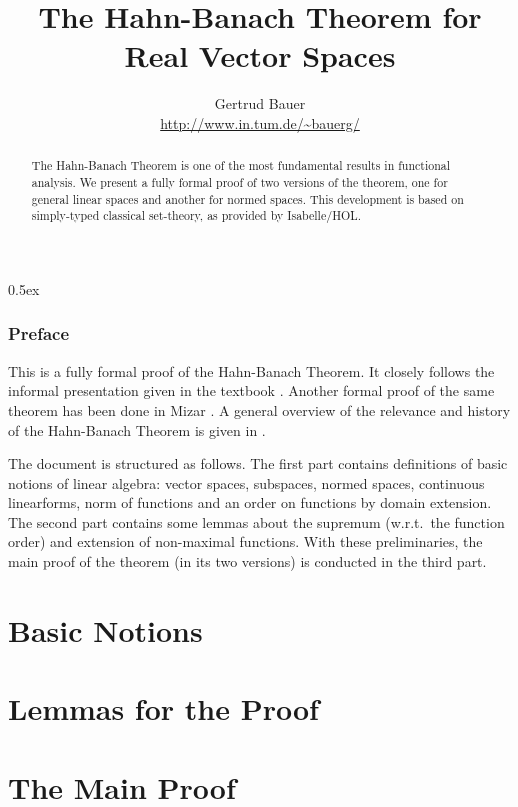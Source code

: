 \documentclass[10pt,a4paper,twoside]{article}
\begin{document}
\pagestyle{headings}

\title{The Hahn-Banach Theorem for Real Vector Spaces}
\author{Gertrud Bauer \\ \url{http://www.in.tum.de/~bauerg/}}
\maketitle

\begin{abstract}
  The Hahn-Banach Theorem is one of the most fundamental results in functional
  analysis. We present a fully formal proof of two versions of the theorem,
  one for general linear spaces and another for normed spaces.  This
  development is based on simply-typed classical set-theory, as provided by
  Isabelle/HOL.
\end{abstract}


\tableofcontents
\parindent 0pt \parskip 0.5ex

\clearpage
\section{Preface}

This is a fully formal proof of the Hahn-Banach Theorem. It closely follows
the informal presentation given in the textbook \cite[{\S} 36]{Heuser:1986}.
Another formal proof of the same theorem has been done in Mizar
\cite{Nowak:1993}.  A general overview of the relevance and history of the
Hahn-Banach Theorem is given in \cite{Narici:1996}.

\medskip The document is structured as follows.  The first part contains
definitions of basic notions of linear algebra: vector spaces, subspaces,
normed spaces, continuous linearforms, norm of functions and an order on
functions by domain extension.  The second part contains some lemmas about the
supremum (w.r.t.\ the function order) and extension of non-maximal functions.
With these preliminaries, the main proof of the theorem (in its two versions)
is conducted in the third part.


\clearpage
\part {Basic Notions}











\clearpage
\part {Lemmas for the Proof}





\clearpage
\part {The Main Proof}




\end{document}
